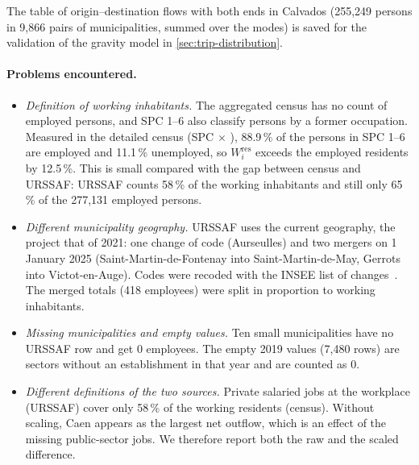 The table of origin--destination flows with both ends in Calvados (255{,}249 persons in 9{,}866 pairs of
municipalities, summed over the modes) is saved for the validation of the gravity model in \cref{sec:trip-distribution}.

\paragraph{Problems encountered.}
\begin{itemize}
  \item \emph{Definition of working inhabitants.} The aggregated census has no count of employed persons, and SPC
  1--6 also classify persons by a former occupation. Measured in the detailed census (SPC $\times$ ),
  88.9\,\% of the persons in SPC 1--6 are employed and 11.1\,\% unemployed, so $W^{\mathrm{res}}_i$ exceeds the
  employed residents by 12.5\,\%. This is small compared with the gap between census and URSSAF: URSSAF counts 58\,\%
  of the working inhabitants and still only 65\,\% of the 277{,}131 employed persons.
  \item \emph{Different municipality geography.} URSSAF uses the current geography, the project that of 2021: one
  change of code (Aurseulles) and two mergers on 1 January 2025 (Saint-Martin-de-Fontenay into Saint-Martin-de-May,
  Gerrots into Victot-en-Auge). Codes were recoded with the INSEE list of changes~\cite{insee-cog-2026}. The merged
  totals (418 employees) were split in proportion to working inhabitants.
  \item \emph{Missing municipalities and empty values.} Ten small municipalities have no URSSAF row and get 0
  employees. The empty 2019 values (7{,}480 rows) are sectors without an establishment in that year and are counted
  as 0.
  \item \emph{Different definitions of the two sources.} Private salaried jobs at the workplace (URSSAF) cover only
  58\,\% of the working residents (census). Without scaling, Caen appears as the largest net outflow, which is an
  effect of the missing public-sector jobs. We therefore report both the raw and the scaled difference.
\end{itemize}
